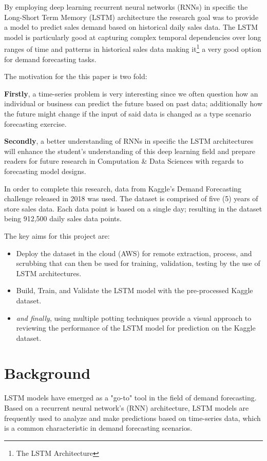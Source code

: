 \documentclass[10pt, conference, compsoc]{IEEEtran}
\begin{document}
By employing deep learning recurrent neural networks (RNNs) in specific the Long-Short Term Memory (LSTM) architecture the research goal was to provide a model to predict sales demand based on historical daily sales data. The LSTM model is particularly good at capturing complex temporal dependencies over long ranges of time and patterns in historical sales data\cite{pharma-sales-forecast-lstm, predicting-sales-lstm, lstm-gru-performance} making it\footnote{The LSTM Architecture} a very good option for demand forecasting tasks.

The motivation for the this paper is two fold:

\textbf{Firstly}, a time-series problem is very interesting since we often question how an individual or business can predict the future based on past data; additionally how the future might change if the input of said data is changed as a type scenario forecasting exercise.

\textbf{Secondly}, a better understanding of RNNs in specific the LSTM architectures will enhance the student's understanding of this deep learning field and prepare readers for future research in Computation \& Data Sciences with regards to forecasting model designs.

In order to complete this research, data from Kaggle's Demand Forecasting challenge\cite{demand-forecasting-kernels-only} released in 2018 was used. The dataset is comprised of five (5) years of store sales data. Each data point is based on a single day; resulting in the dataset being 912,500 daily sales data points.

The key aims for this project are:
\begin{itemize}
    \item Deploy the dataset in the cloud (AWS) for remote extraction, process, and scrubbing that can then be used for training, validation, testing by the use of LSTM architectures.
    \item Build, Train, and Validate the LSTM model with the pre-processed Kaggle\cite{demand-forecasting-kernels-only} dataset.
    \item \textit{and finally}, using multiple potting techniques provide a visual approach to reviewing the performance of the LSTM model for prediction on the Kaggle\cite{demand-forecasting-kernels-only} dataset.
\end{itemize}

\section{Background}
LSTM models have emerged as a "go-to" tool\cite{pharma-sales-forecast-lstm, predicting-sales-lstm} in the field of demand forecasting. Based on a recurrent neural network's (RNN) architecture, LSTM models are frequently used\cite{pharma-sales-forecast-lstm} to analyze and make predictions based on time-series data, which is a common characteristic in demand forecasting scenarios.
\end{document}

